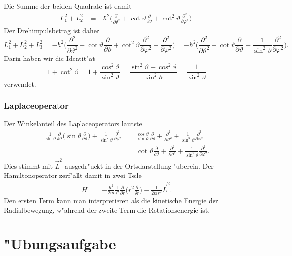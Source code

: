 Die Summe der beiden Quadrate ist damit
\begin{align*}
L_1^2+L_2^2
&=
-\hbar^2\biggl(
\frac{\partial^2}{\partial\vartheta^2}
+
\cot\vartheta\frac{\partial}{\partial\vartheta}
+
\cot^2\vartheta\frac{\partial^2}{\partial\varphi^2}
\biggr).
\end{align*}
Der Drehimpulsbetrag ist daher
\[
L_1^2+L_2^2+L_3^2
=
-\hbar^2\biggl(
\frac{\partial^2}{\partial\vartheta^2}
+
\cot\vartheta\frac{\partial}{\partial\vartheta}
+
\cot^2\vartheta\frac{\partial^2}{\partial\varphi^2}
+
\frac{\partial^2}{\partial\varphi^2}
\biggr)
=
-\hbar^2\biggl(
\frac{\partial^2}{\partial\vartheta^2}
+
\cot\vartheta\frac{\partial}{\partial\vartheta}
+
\frac1{\sin^2\vartheta}\frac{\partial^2}{\partial\varphi^2}
\biggr).
\]
Darin haben wir die Identit"at
\[
1+\cot^2\vartheta
=
1+\frac{\cos^2\vartheta}{\sin^2\vartheta}
=
\frac{\sin^2\vartheta+\cos^2\vartheta}{\sin^2\vartheta}
=
\frac{1}{\sin^2\vartheta}
\]
verwendet.

\subsubsection{Laplaceoperator}
Der Winkelanteil des Laplaceoperators lautete
\begin{align*}
\frac1{\sin\vartheta}\frac{\partial}{\partial\vartheta}\biggl(
\sin\vartheta\frac{\partial}{\partial\vartheta}
\biggr)
+\frac1{\sin^2\vartheta}\frac{\partial^2}{\partial\varphi^2}
&=
\frac{\cos\vartheta}{\sin\vartheta}\frac{\partial}{\partial\vartheta}
+
\frac{\partial^2}{\partial\vartheta^2}
+
\frac{1}{\sin^2\vartheta}\frac{\partial^2}{\partial\varphi^2}
\\
&=
\cot\vartheta\frac{\partial}{\partial\vartheta}
+
\frac{\partial^2}{\partial\vartheta^2}
+
\frac{1}{\sin^2\vartheta}\frac{\partial^2}{\partial\varphi^2}.
\end{align*}
Dies stimmt mit $\vec L^2$ ausgedr"uckt in der Ortsdarstellung "uberein.
Der Hamiltonoperator zerf"allt damit in zwei Teile
\begin{align*}
H
&=-\frac{\hbar^2}{2m}
\frac1{r^2}\frac{\partial}{\partial r}\biggl(r^2\frac{\partial}{\partial r}\biggr)
-\frac{1}{2mr^2}\vec L^2.
\end{align*}
Den ersten Term kann man interpretieren als die kinetische Energie
der Radialbewegung, w"ahrend der zweite Term die Rotationsenergie ist.

\section*{"Ubungsaufgabe}
\begin{uebungsaufgaben}
\item

\end{uebungsaufgaben}
